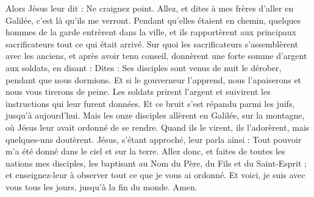 \begin{multicols}{2}
Alors Jésus leur dit : Ne craignez point. Allez, et dites à mes frères d'aller en Galilée, c’est là qu'ils me verront.
Pendant qu’elles étaient en chemin, quelques hommes de la garde entrèrent dans la ville, et ils rapportèrent aux principaux sacrificateurs tout ce qui était arrivé.
Sur quoi les sacrificateurs s'assemblèrent avec les anciens, et après avoir tenu conseil, donnèrent une forte somme d'argent aux soldats,
en disant : Dites : Ses disciples sont venus de nuit le dérober, pendant que nous dormions.
Et si le gouverneur l’apprend, nous l’apaiserons et nous vous tirerons de peine.
Les soldats prirent l'argent et suivirent les instructions qui leur furent données. Et ce bruit s’est répandu parmi les juifs, jusqu’à aujourd’hui.
Mais les onze disciples allèrent en Galilée, sur la montagne, où Jésus leur avait ordonné de se rendre.
Quand ils le virent, ils l'adorèrent, mais quelques-uns doutèrent.
Jésus, s’étant approché, leur parla ainsi : Tout pouvoir m’a été donné dans le ciel et sur la terre.
Allez donc, et faites de toutes les nations mes disciples, les baptisant au Nom du Père, du Fils et du Saint-Esprit ;
et enseignez-leur à observer tout ce que je vous ai ordonné. Et voici, je suis avec vous tous les jours, jusqu’à la fin du monde. Amen.
\PPE{}
\end{multicols}
